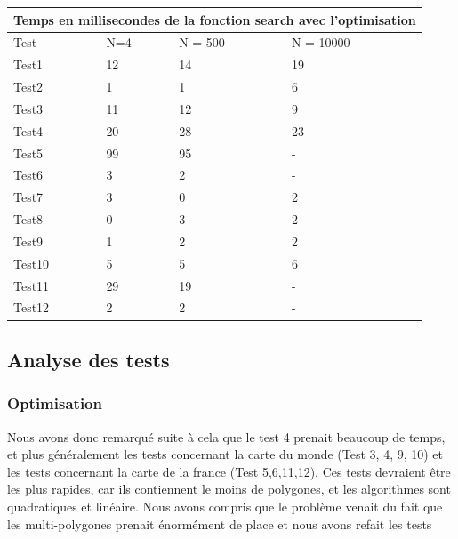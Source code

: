 \documentclass[utf8]{article}
\begin{document}
\begin{large}
  \begin{tabular}{ |p{3cm}||p{3cm}|p{3cm}|p{3cm}|  }
    \hline
    \multicolumn{4}{|c|}{Temps en millisecondes de la fonction search avec l'optimisation} \\
    \hline
    Test   & N=4 & N = 500 & N = 10000                                                     \\
    \hline
    Test1  & 12  & 14      & 19                                                            \\
    Test2  & 1   & 1       & 6                                                             \\
    Test3  & 11  & 12      & 9                                                             \\
    Test4  & 20  & 28      & 23                                                            \\
    Test5  & 99  & 95      & -                                                             \\
    Test6  & 3   & 2       & -                                                             \\
    Test7  & 3   & 0       & 2                                                             \\
    Test8  & 0   & 3       & 2                                                             \\
    Test9  & 1   & 2       & 2                                                             \\
    Test10 & 5   & 5       & 6                                                             \\
    Test11 & 29  & 19      & -                                                             \\
    Test12 & 2   & 2       & -                                                             \\
    \hline
  \end{tabular}



  \subsection{Analyse des tests}\label{Analyse des tests}
  \subsubsection{Optimisation}
  \par
  \indent
  Nous avons donc remarqué suite à cela que le test 4 prenait beaucoup de temps,
  et plus généralement les tests concernant la carte du monde (Test 3, 4, 9, 10)
  et les tests concernant la carte de la france (Test 5,6,11,12). Ces tests
  devraient être les plus rapides, car ils contiennent le moins de polygones, et
  les algorithmes sont quadratiques et linéaire. Nous avons compris que le
  problème venait du fait que les multi-polygones prenait énormément de place et nous avons refait les tests
  \par

\end{large}
\end{document}
